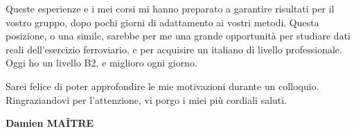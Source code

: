 \documentclass[a4paper,11pt]{extarticle}
\begin{document}
Queste esperienze e i mei corsi mi hanno preparato a garantire risultati per il vostro gruppo, dopo pochi giorni di adattamento ai vostri metodi. Questa posizione, o una simile, sarebbe per me una grande opportunità per studiare dati reali dell'esercizio ferroviario, e per acquisire un italiano di livello professionale. Oggi ho un livello B2, e miglioro ogni giorno.

Sarei felice di poter approfondire le mie motivazioni durante un colloquio. Ringraziandovi per l'attenzione, vi porgo i miei più cordiali saluti.

\vspace{14pt}
\begin{flushright}
  \textbf{\color{accent}Damien MAÎTRE}
\end{flushright}
\end{document}
